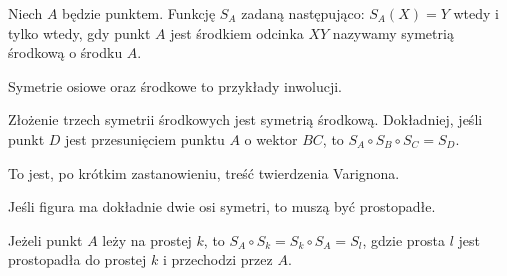 
\begin{definition}
    Niech $A$ będzie punktem.
    Funkcję $S_A$ zadaną następująco: $S_A(X) = Y$ wtedy i tylko wtedy, gdy punkt $A$ jest środkiem odcinka $XY$ nazywamy symetrią środkową o środku $A$.
\end{definition}

\begin{example}
    Symetrie osiowe oraz środkowe to przykłady inwolucji.
\end{example}

\begin{proposition}
    Złożenie trzech symetrii środkowych jest symetrią środkową.
    Dokładniej, jeśli punkt $D$ jest przesunięciem punktu $A$ o wektor $BC$, to $S_A \circ S_B \circ S_C = S_D$.
\end{proposition}

To jest, po krótkim zastanowieniu, treść twierdzenia Varignona.
%

Jeśli figura ma dokładnie dwie osi symetri, to muszą być prostopadłe.

\begin{proposition}
    Jeżeli punkt $A$ leży na prostej $k$, to $S_A \circ S_k = S_k \circ S_A = S_l$, gdzie prosta $l$ jest prostopadła do prostej $k$ i przechodzi przez $A$.
\end{proposition}
